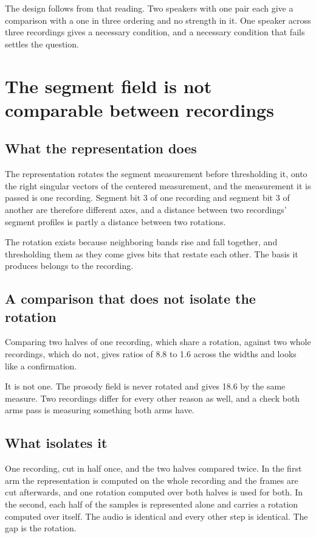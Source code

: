 The design follows from that reading. Two speakers with one pair each give a comparison with a one in
three ordering and no strength in it. One speaker across three recordings gives a necessary
condition, and a necessary condition that fails settles the question.

\section{The segment field is not comparable between recordings}

\subsection{What the representation does}

The representation rotates the segment measurement before thresholding it, onto the right singular
vectors of the centered measurement, and the measurement it is passed is one recording. Segment bit 3
of one recording and segment bit 3 of another are therefore different axes, and a distance between
two recordings' segment profiles is partly a distance between two rotations.

The rotation exists because neighboring bands rise and fall together, and thresholding them as they
come gives bits that restate each other. The basis it produces belongs to the recording.

\subsection{A comparison that does not isolate the rotation}

Comparing two halves of one recording, which share a rotation, against two whole recordings, which do
not, gives ratios of 8.8 to 1.6 across the widths and looks like a confirmation.

It is not one. The prosody field is never rotated and gives 18.6 by the same measure. Two recordings
differ for every other reason as well, and a check both arms pass is measuring something both arms
have.

\subsection{What isolates it}

One recording, cut in half once, and the two halves compared twice. In the first arm the
representation is computed on the whole recording and the frames are cut afterwards, and one
rotation computed over both halves is used for both. In the second, each half of the samples is represented
alone and carries a rotation computed over itself. The audio is identical and every other step is
identical. The gap is the rotation.

